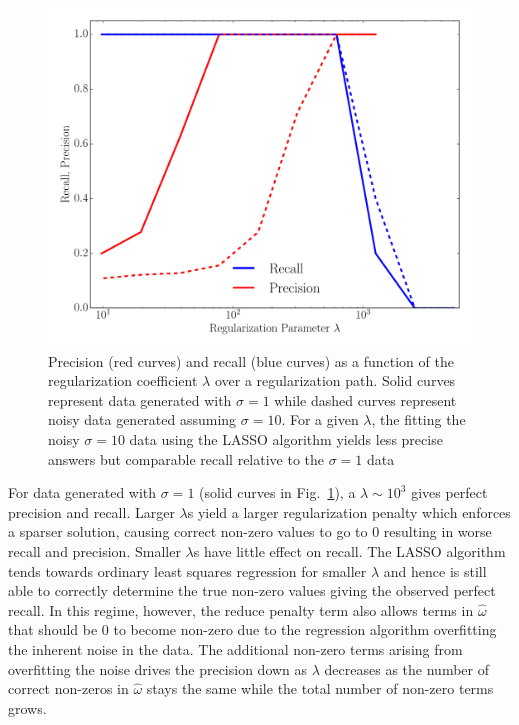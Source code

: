 \documentclass[12pt]{amsart}
\begin{document}
\begin{figure}[H]
	\includegraphics[width=\columnwidth]{synthetic_prec_rec.pdf}
    \caption{Precision (red curves) and recall (blue curves) as a function of the regularization coefficient $\lambda$ over a regularization path.  Solid curves represent data generated with $\sigma = 1$ while dashed curves represent noisy data generated assuming $\sigma = 10$.  For a given $\lambda$, the fitting the noisy $\sigma = 10$ data using the LASSO algorithm yields less precise answers but comparable recall relative to the $\sigma = 1$ data}
    \label{fig:synth_reg}
\end{figure}

For data generated with $\sigma = 1$ (solid curves in Fig.~\ref{fig:synth_reg}), a $\lambda \sim 10^3$ gives perfect precision and recall.  Larger $\lambda$s yield a larger regularization penalty which enforces a sparser solution, causing correct non-zero values to go to 0 resulting in worse recall and precision.  Smaller $\lambda$s have little effect on recall.  The LASSO algorithm tends towards ordinary least squares regression for smaller $\lambda$ and hence is still able to correctly determine the true non-zero values giving the observed perfect recall.  In this regime, however, the reduce penalty term also allows terms in $\hat{\omega}$ that should be 0 to become non-zero due to the regression algorithm overfitting the inherent noise in the data.  The additional non-zero terms arising from overfitting the noise drives the precision down as $\lambda$ decreases as the number of correct non-zeros in $\hat{\omega}$ stays the same while the total number of non-zero terms grows.
\end{document}
